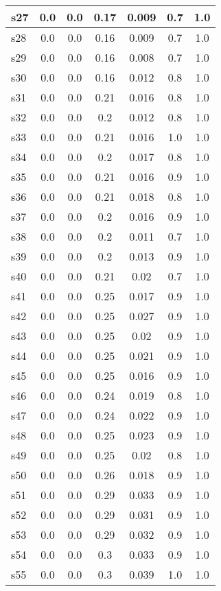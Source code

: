 \documentclass{article}
\begin{document}
\begin{tabular}{|l|c|c|c|c|c|c|}
\hline
s27 &0.0 & 0.0 & 0.17 & 0.009 & 0.7 & 1.0\\
\hline
s28 &0.0 & 0.0 & 0.16 & 0.009 & 0.7 & 1.0\\
\hline
s29 &0.0 & 0.0 & 0.16 & 0.008 & 0.7 & 1.0\\
\hline
s30 &0.0 & 0.0 & 0.16 & 0.012 & 0.8 & 1.0\\
\hline
s31 &0.0 & 0.0 & 0.21 & 0.016 & 0.8 & 1.0\\
\hline
s32 &0.0 & 0.0 & 0.2 & 0.012 & 0.8 & 1.0\\
\hline
s33 &0.0 & 0.0 & 0.21 & 0.016 & 1.0 & 1.0\\
\hline
s34 &0.0 & 0.0 & 0.2 & 0.017 & 0.8 & 1.0\\
\hline
s35 &0.0 & 0.0 & 0.21 & 0.016 & 0.9 & 1.0\\
\hline
s36 &0.0 & 0.0 & 0.21 & 0.018 & 0.8 & 1.0\\
\hline
s37 &0.0 & 0.0 & 0.2 & 0.016 & 0.9 & 1.0\\
\hline
s38 &0.0 & 0.0 & 0.2 & 0.011 & 0.7 & 1.0\\
\hline
s39 &0.0 & 0.0 & 0.2 & 0.013 & 0.9 & 1.0\\
\hline
s40 &0.0 & 0.0 & 0.21 & 0.02 & 0.7 & 1.0\\
\hline
s41 &0.0 & 0.0 & 0.25 & 0.017 & 0.9 & 1.0\\
\hline
s42 &0.0 & 0.0 & 0.25 & 0.027 & 0.9 & 1.0\\
\hline
s43 &0.0 & 0.0 & 0.25 & 0.02 & 0.9 & 1.0\\
\hline
s44 &0.0 & 0.0 & 0.25 & 0.021 & 0.9 & 1.0\\
\hline
s45 &0.0 & 0.0 & 0.25 & 0.016 & 0.9 & 1.0\\
\hline
s46 &0.0 & 0.0 & 0.24 & 0.019 & 0.8 & 1.0\\
\hline
s47 &0.0 & 0.0 & 0.24 & 0.022 & 0.9 & 1.0\\
\hline
s48 &0.0 & 0.0 & 0.25 & 0.023 & 0.9 & 1.0\\
\hline
s49 &0.0 & 0.0 & 0.25 & 0.02 & 0.8 & 1.0\\
\hline
s50 &0.0 & 0.0 & 0.26 & 0.018 & 0.9 & 1.0\\
\hline
s51 &0.0 & 0.0 & 0.29 & 0.033 & 0.9 & 1.0\\
\hline
s52 &0.0 & 0.0 & 0.29 & 0.031 & 0.9 & 1.0\\
\hline
s53 &0.0 & 0.0 & 0.29 & 0.032 & 0.9 & 1.0\\
\hline
s54 &0.0 & 0.0 & 0.3 & 0.033 & 0.9 & 1.0\\
\hline
s55 &0.0 & 0.0 & 0.3 & 0.039 & 1.0 & 1.0\\

\end{tabular}
\end{document}
